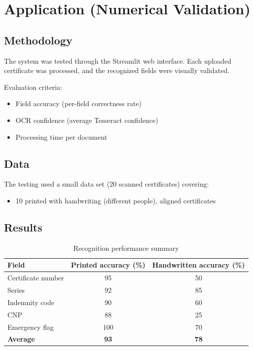 \documentclass[runningheads,a4paper,11pt]{report}
\begin{document}
\chapter{Application (Numerical Validation)}
\label{chapter:application}

\section{Methodology}
The system was tested through the Streamlit web interface. Each uploaded certificate was processed, and the recognized fields were visually validated.

Evaluation criteria:
\begin{itemize}
\item Field accuracy (per-field correctness rate)
\item OCR confidence (average Tesseract confidence)
\item Processing time per document
\end{itemize}

\section{Data}
The testing used a small data set (20 scanned certificates) covering:
\begin{itemize}
\item 10 printed with handwriting (different people), aligned certificates
\end{itemize}

\section{Results}
\begin{table}[htbp]
\caption{Recognition performance summary}
\label{tab:results}
\begin{center}
\begin{tabular}{l c c}
\textbf{Field} & \textbf{Printed accuracy (\%)} & \textbf{Handwritten accuracy (\%)}\\
\hline
Certificate number & 95 & 50\\
Series & 92 & 85\\
Indemnity code & 90 & 60\\
CNP & 88 & 25\\
Emergency flag & 100 & 70\\
\hline
\textbf{Average} & \textbf{93} & \textbf{78}\\
\end{tabular}
\end{center}
\end{table}
\end{document}
